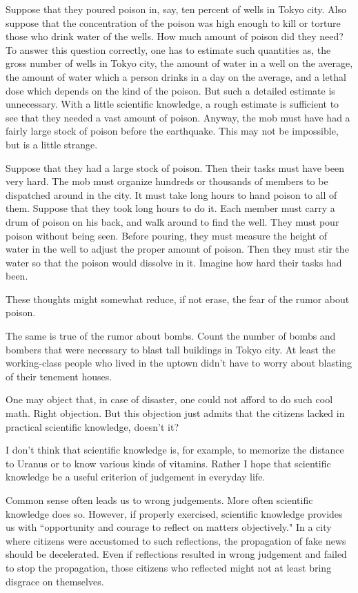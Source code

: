\documentclass[11pt,a4j,twocolumn]{jarticle}
\begin{document}
Suppose that they poured poison in, say, ten percent of wells in Tokyo city.
Also suppose that the concentration of the poison was high enough
to kill or torture those who drink water of the wells.
How much amount of poison did they need?
To answer this question correctly, one has to estimate such quantities as,
the gross number of wells in Tokyo city, the amount of water in a well on the average,
the amount of water which a person drinks in a day on the average,
and a lethal dose which depends on the kind of the poison.
But such a detailed estimate is unnecessary.
With a little scientific knowledge, a rough estimate is sufficient 
to see that they needed a vast amount of poison.
Anyway, the mob must have had a fairly large stock of poison before the earthquake.
This may not be impossible, but is a little strange.

Suppose that they had a large stock of poison.
Then their tasks must have been very hard.
The mob must organize hundreds or thousands of members
to be dispatched around in the city.
It must take long hours to hand poison to all of them.
Suppose that they took long hours to do it.
Each member must carry a drum of poison on his back, and walk around to find the well.
They must pour poison without being seen.
Before pouring, they must measure the height of water in the well
to adjust the proper amount of poison.
Then they must stir the water so that the poison would dissolve in it.
Imagine how hard their tasks had been.

These thoughts might somewhat reduce, if not erase, the fear of the rumor about poison.

The same is true of the rumor about bombs.
Count the number of bombs and bombers that were necessary
to blast tall buildings in Tokyo city.
At least the working-class people who lived in the uptown
didn't have to worry about blasting of their tenement houses.

One may object that, in case of disaster, one could not afford to do such cool math.
Right objection. But this objection just admits that the citizens lacked
in practical scientific knowledge, doesn't it?

I don't think that scientific knowledge is, for example,
to memorize the distance to Uranus or to know various kinds of vitamins.
Rather I hope that scientific knowledge be a useful criterion of judgement in everyday life.

Common sense often leads us to wrong judgements.
More often scientific knowledge does so.
However, if properly exercised, scientific knowledge
provides us with ``opportunity and courage to reflect on matters objectively."
In a city where citizens were accustomed to such reflections,
the propagation of fake news should be decelerated.
Even if reflections resulted in wrong judgement and failed to stop the propagation,
those citizens who reflected might not at least bring disgrace on themselves.
\end{document}

